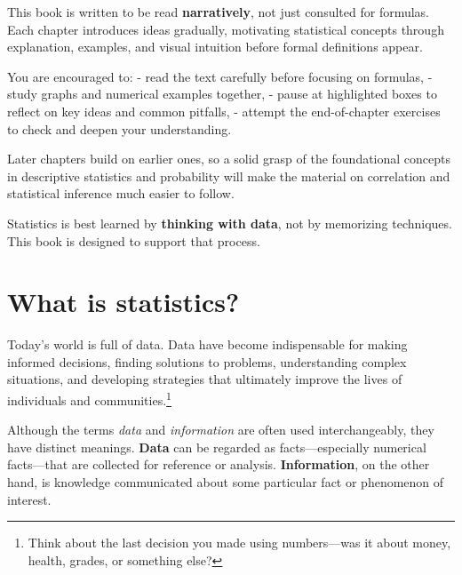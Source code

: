 \documentclass[
  letterpaper,
  DIV=11,
  numbers=noendperiod]{scrreprt}
\begin{document}
\begin{tcolorbox}[enhanced jigsaw, coltitle=black, colbacktitle=quarto-callout-note-color!10!white, left=2mm, bottomrule=.15mm, bottomtitle=1mm, colback=white, titlerule=0mm, colframe=quarto-callout-note-color-frame, breakable, leftrule=.75mm, toptitle=1mm, opacitybacktitle=0.6, rightrule=.15mm, title=\textcolor{quarto-callout-note-color}{\faInfo}\hspace{0.5em}{How to use these notes}, arc=.35mm, opacityback=0, toprule=.15mm]

This book is written to be read \textbf{narratively}, not just consulted
for formulas. Each chapter introduces ideas gradually, motivating
statistical concepts through explanation, examples, and visual intuition
before formal definitions appear.

You are encouraged to: - read the text carefully before focusing on
formulas, - study graphs and numerical examples together, - pause at
highlighted boxes to reflect on key ideas and common pitfalls, - attempt
the end-of-chapter exercises to check and deepen your understanding.

Later chapters build on earlier ones, so a solid grasp of the
foundational concepts in descriptive statistics and probability will
make the material on correlation and statistical inference much easier
to follow.

Statistics is best learned by \textbf{thinking with data}, not by
memorizing techniques. This book is designed to support that process.

\end{tcolorbox}

\section{What is statistics?}\label{what-is-statistics}

Today's world is full of data. Data have become indispensable for making
informed decisions, finding solutions to problems, understanding complex
situations, and developing strategies that ultimately improve the lives
of individuals and communities.\footnote{Think about the last decision
  you made using numbers---was it about money, health, grades, or
  something else?}

Although the terms \emph{data} and \emph{information} are often used
interchangeably, they have distinct meanings. \textbf{Data} can be
regarded as facts---especially numerical facts---that are collected for
reference or analysis. \textbf{Information}, on the other hand, is
knowledge communicated about some particular fact or phenomenon of
interest.
\end{document}
